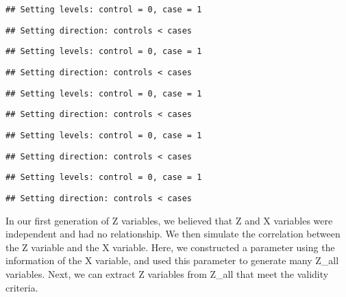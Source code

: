 \documentclass[
]{article}
\begin{document}
\begin{verbatim}
## Setting levels: control = 0, case = 1
\end{verbatim}

\begin{verbatim}
## Setting direction: controls < cases
\end{verbatim}

\begin{verbatim}
## Setting levels: control = 0, case = 1
\end{verbatim}

\begin{verbatim}
## Setting direction: controls < cases
\end{verbatim}

\begin{verbatim}
## Setting levels: control = 0, case = 1
\end{verbatim}

\begin{verbatim}
## Setting direction: controls < cases
\end{verbatim}

\begin{verbatim}
## Setting levels: control = 0, case = 1
\end{verbatim}

\begin{verbatim}
## Setting direction: controls < cases
\end{verbatim}

\begin{verbatim}
## Setting levels: control = 0, case = 1
\end{verbatim}

\begin{verbatim}
## Setting direction: controls < cases
\end{verbatim}

In our first generation of Z variables, we believed that Z and X
variables were independent and had no relationship. We then simulate the
correlation between the Z variable and the X variable. Here, we
constructed a parameter using the information of the X variable, and
used this parameter to generate many Z\_all variables. Next, we can
extract Z variables from Z\_all that meet the validity criteria.
\end{document}
